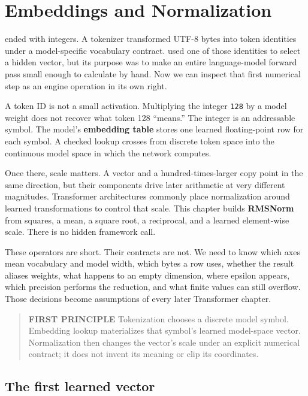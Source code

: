 \chapter{Embeddings and Normalization}\label{chapter-7-embeddings-and-normalization}\label{app:embeddings-norm}
 ended with integers. A tokenizer transformed UTF-8 bytes into
token identities under a model-specific vocabulary contract. 
used one of those identities to select a hidden vector, but its purpose
was to make an entire language-model forward pass small enough to
calculate by hand. Now we can inspect that first numerical step as an
engine operation in its own right.

A token ID is not a small activation. Multiplying the integer
\texttt{128} by a model weight does not recover what token 128
``means.'' The integer is an addressable symbol. The model's
\textbf{embedding table} stores one learned floating-point row for each
symbol. A checked lookup crosses from discrete token space into the
continuous model space in which the network computes.

Once there, scale matters. A vector and a hundred-times-larger copy
point in the same direction, but their components drive later arithmetic
at very different magnitudes. Transformer architectures commonly place
normalization around learned transformations to control that scale. This
chapter builds \textbf{RMSNorm} from squares, a mean, a square root, a
reciprocal, and a learned element-wise scale. There is no hidden
framework call.

These operators are short. Their contracts are not. We need to know
which axes mean vocabulary and model width, which bytes a row uses,
whether the result aliases weights, what happens to an empty dimension,
where epsilon appears, which precision performs the reduction, and what
finite values can still overflow. Those decisions become assumptions of
every later Transformer chapter.

\begin{quote}
\textbf{FIRST PRINCIPLE} Tokenization chooses a discrete model symbol.
Embedding lookup materializes that symbol's learned model-space vector.
Normalization then changes the vector's scale under an explicit
numerical contract; it does not invent its meaning or clip its
coordinates.
\end{quote}

\section{The first learned vector}\label{the-first-learned-vector}

